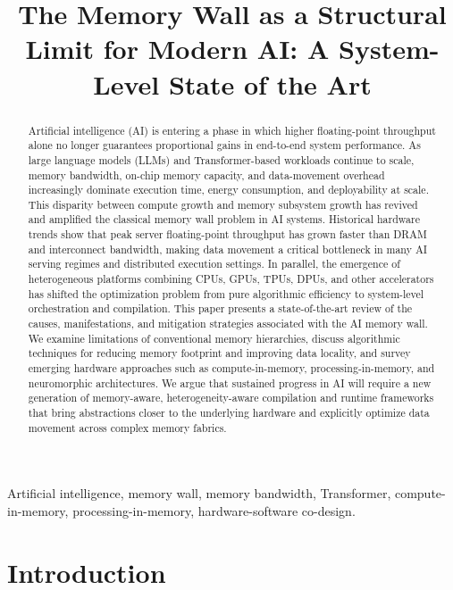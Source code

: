 \documentclass[conference]{IEEEtran}
\title{The Memory Wall as a Structural Limit for Modern AI: A System-Level State of the Art}
\author{\IEEEauthorblockN{Dr. Patrick Lemoine}
\IEEEauthorblockA{Independent Researcher / HPC and AI Systems Engineer\\
Email: \texttt{lemoine\_patrick@yahoo.ca}\\
ORCID: \url{https://orcid.org/0009-0008-9465-8159}}}
\begin{document}
\maketitle

\begin{abstract}
Artificial intelligence (AI) is entering a phase in which higher floating-point throughput alone no longer guarantees proportional gains in end-to-end system performance. As large language models (LLMs) and Transformer-based workloads continue to scale, memory bandwidth, on-chip memory capacity, and data-movement overhead increasingly dominate execution time, energy consumption, and deployability at scale. This disparity between compute growth and memory subsystem growth has revived and amplified the classical memory wall problem in AI systems. Historical hardware trends show that peak server floating-point throughput has grown faster than DRAM and interconnect bandwidth, making data movement a critical bottleneck in many AI serving regimes and distributed execution settings. In parallel, the emergence of heterogeneous platforms combining CPUs, GPUs, TPUs, DPUs, and other accelerators has shifted the optimization problem from pure algorithmic efficiency to system-level orchestration and compilation. This paper presents a state-of-the-art review of the causes, manifestations, and mitigation strategies associated with the AI memory wall. We examine limitations of conventional memory hierarchies, discuss algorithmic techniques for reducing memory footprint and improving data locality, and survey emerging hardware approaches such as compute-in-memory, processing-in-memory, and neuromorphic architectures. We argue that sustained progress in AI will require a new generation of memory-aware, heterogeneity-aware compilation and runtime frameworks that bring abstractions closer to the underlying hardware and explicitly optimize data movement across complex memory fabrics.
\end{abstract}

\begin{IEEEkeywords}
Artificial intelligence, memory wall, memory bandwidth, Transformer, compute-in-memory, processing-in-memory, hardware-software co-design.
\end{IEEEkeywords}

\section{Introduction}
\end{document}
